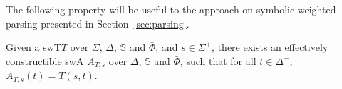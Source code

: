 \documentclass[runningheads]{llncs}
\newcommand{\Semiring}{\mathbb{S}}
\newcommand{\zero}{\mathbb{0}}
\def\SWT{\textsf{swT}\xspace}
\def\SWA{\textsf{swA}\xspace}
\def\wei{\mathsf{w}}
\begin{document}
%
      
      
      
      
\noindent
The following property will be useful to the approach on 
symbolic weighted parsing presented in Section~\ref{sec:parsing}.

\begin{proposition} \label{prop:epsilon}
Given a \SWT $T$ over $\Sigma$, $\Delta$, $\Semiring$ and $\bar\Phi$,
and $s \in \Sigma^+$, 
there exists an effectively constructible \SWA 
$A_{T, s}$ over $\Delta$, $\Semiring$ and $\bar\Phi$,
such that for all $t \in \Delta^+$, $A_{T, s}(t) = T(s, t)$.
\end{proposition}
%
\end{document}
